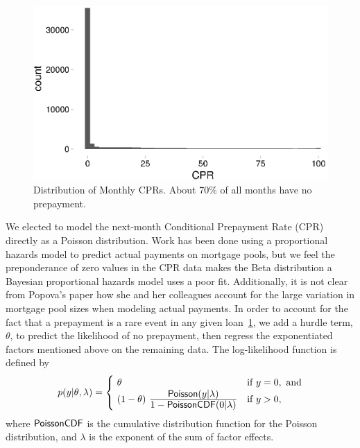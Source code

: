 \documentclass{article}
\newcommand{\distro}[1]{\mbox{\sf #1}}
\begin{document}
\begin{figure}
	\centering
	\includegraphics[scale=0.5]{white_paper_files/cpr_hist}
	\caption{Distribution of Monthly CPRs. About 70\% of all months have no prepayment.}
	\label{fig:cpr_hist}
\end{figure}
We elected to model the next-month Conditional Prepayment Rate (CPR) directly as a Poisson distribution. Work has been done using a proportional hazards model to predict actual payments on mortgage pools\cite{popova2008bayesian},  but we feel the preponderance of zero values in the CPR data makes the Beta distribution a Bayesian proportional hazards model uses a poor fit. Additionally, it is not clear from Popova's paper how she and her colleagues account for the large variation in mortgage pool sizes when modeling actual payments. In order to account for the fact that a prepayment is a rare event in any given loan~\ref{fig:cpr_hist}, we add a hurdle term, $\theta$, to predict the likelihood of no prepayment, then regress the exponentiated factors mentioned above on the remaining data. The log-likelihood function is defined by 
%
\[
p(y|\theta,\lambda)
= 
\begin{cases}
\ \theta & \mbox{if } y = 0, \mbox{ and}
\\
\ (1 - \theta)
  \
   \frac{\displaystyle \distro{Poisson}(y | \lambda)}
        {\displaystyle \vspace*{8pt} 1 - \distro{PoissonCDF}(0 | \lambda)}
& \mbox{if } y > 0,
\end{cases}
\]
%
where $\distro{PoissonCDF}$ is the cumulative distribution function for the Poisson distribution\cite{stan_manual}, and $\lambda$ is the exponent of the sum of factor effects.
\end{document}
